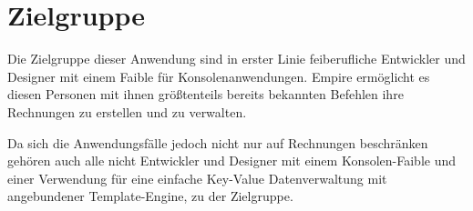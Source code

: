 
\section{Zielgruppe}

Die Zielgruppe dieser Anwendung sind in erster Linie feiberufliche Entwickler und Designer mit einem Faible für Konsolenanwendungen. Empire ermöglicht es diesen Personen mit ihnen größtenteils bereits bekannten Befehlen ihre Rechnungen zu erstellen und zu verwalten.

Da sich die Anwendungsfälle jedoch nicht nur auf Rechnungen beschränken gehören auch alle nicht Entwickler und Designer mit einem Konsolen-Faible und einer Verwendung für eine einfache Key-Value Datenverwaltung mit angebundener Template-Engine, zu der Zielgruppe.
